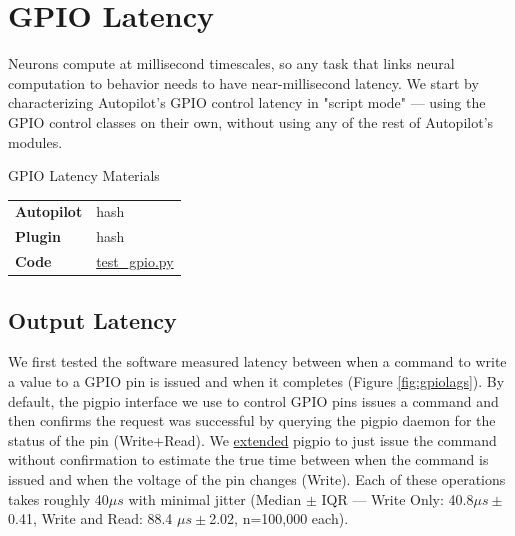 \section{GPIO Latency}
\label{sec:gpiolatency}

Neurons compute at millisecond timescales, so any task that links neural computation to behavior needs to have near-millisecond latency. We start by characterizing Autopilot's GPIO control latency in "script mode" --- using the GPIO control classes on their own, without using any of the rest of Autopilot's modules.

\begin{margintable}[0cm]
\caption{GPIO Latency Materials}
\label{tab:gpiomaterials}
\noindent\begin{tabularx}{\linewidth}{lX}%
\toprule
\textbf{Autopilot} & hash \\
\textbf{Plugin} & hash \\
\textbf{Code} & \href{https://github.com/auto-pi-lot/plugin-tests/blob/main/plugin_tests/scripts/test_gpio.py}{test\_gpio.py} \\
\bottomrule
\end{tabularx}
\end{margintable}

\subsection{Output Latency}

We first tested the software measured latency between when a command to write a value to a GPIO pin is issued and when it completes (Figure \ref{fig:gpiolags}). By default, the pigpio interface we use to control GPIO pins issues a command and then confirms the request was successful by querying the pigpio daemon for the status of the pin (Write+Read). We \href{https://github.com/sneakers-the-rat/pigpio/commit/0782de06f0a5c092063118733ad2df9d65f1f1a0}{extended} pigpio to just issue the command without confirmation to estimate the true time between when the command is issued and when the voltage of the pin changes (Write). Each of these operations takes roughly 40$\mu s$ with minimal jitter (Median $\pm$ IQR --- Write Only: 40.8$\mu s \pm$0.41, Write and Read: 88.4 $\mu s \pm$2.02, n=100,000 each).

